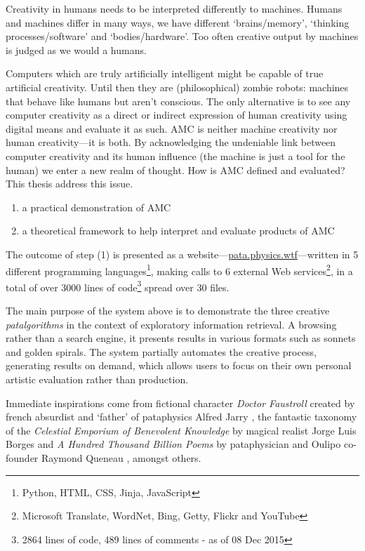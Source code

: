 Creativity in humans needs to be interpreted differently to machines. Humans and machines differ in many ways, we have different `brains/memory', `thinking processes/software' and `bodies/hardware'. Too often creative output by machines is judged as we would a humans. 

Computers which are truly artificially intelligent might be capable of true artificial creativity. Until then they are (philosophical) zombie robots: machines that behave like humans but aren't conscious. The only alternative is to see any computer creativity as a direct or indirect expression of human creativity using digital means and evaluate it as such. \ac{AMC} is neither machine creativity nor human creativity---it is both. By acknowledging the undeniable link between computer creativity and its human influence (the machine is just a tool for the human) we enter a new realm of thought. How is \ac{AMC} defined and evaluated? This thesis address this issue. 

\begin{enumerate}
  \item a practical demonstration of \ac{AMC}
  \item a theoretical framework to help interpret and evaluate products of \ac{AMC}
\end{enumerate}

The outcome of step (1) is presented as a website---\url{pata.physics.wtf}---written in \num{5} different programming languages\footnote{Python, \ac{HTML}, CSS, Jinja, JavaScript}, making calls to \num{6} external Web services\footnote{Microsoft Translate, WordNet, Bing, Getty, Flickr and YouTube}, in a total of over \num{3000} lines of code\footnote{\num{2864} lines of code, \num{489} lines of comments - as of 08 Dec 2015} spread over \num{30} files.

The main purpose of the system above is to demonstrate the three creative \emph{patalgorithms} in the context of exploratory information retrieval. A browsing rather than a search engine, it presents results in various formats such as sonnets and golden spirals. The system partially automates the creative process, generating results on demand, which allows users to focus on their own personal artistic evaluation rather than production.

Immediate inspirations come from fictional character \textit{Doctor Faustroll} created by french absurdist and `father' of pataphysics Alfred Jarry \citeyear{Jarry1996}, the fantastic taxonomy of the \textit{Celestial Emporium of Benevolent Knowledge} by magical realist Jorge Luis Borges \citeyear{Borges2000} and \textit{A Hundred Thousand Billion Poems} by pataphysician and Oulipo co-founder Raymond Queneau \citeyear{Queneau1961}, amongst others.


